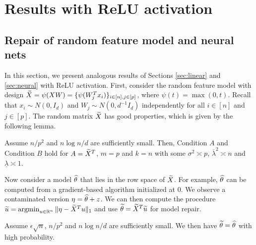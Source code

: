 


\section{Results with ReLU activation}


\subsection{Repair of random feature model and neural nets} \label{app:results}

In this section, we present analogous results of Sections \ref{sec:linear} and \ref{sec:neural} with ReLU activation. First, consider the random feature model with design $\widetilde{X}=\psi(XW)=\{\psi(W_j^Tx_i)\}_{i\in[n],j\in[p]}$, where $\psi(t)=\max(0,t)$. Recall that $x_i\sim N(0,I_d)$ and $W_j\sim N(0,d^{-1}I_d)$ independently for all $i\in[n]$ and $j\in[p]$. The random matrix $\widetilde{X}$ has good properties, which is given by the following lemma.
\begin{lemma}\label{lem:design-rf-relu}
Assume $n/p^2$ and $n\log n/d$ are sufficiently small. Then, Condition $A$ and Condition $B$ hold for $A=\widetilde{X}^T$, $m=p$ and $k=n$ with some $\sigma^2\asymp p$, $\overline{\lambda}^2\asymp n$ and $\underline{\lambda}\asymp 1$.
\end{lemma}

Now consider a model $\widehat{\theta}$ that lies in the row space of $\widetilde{X}$. For example, $\widehat{\theta}$ can be computed from a gradient-based algorithm initialized at $0$. We observe a contaminated version $\eta=\widehat{\theta}+z$.
We can then compute the procedure $\widetilde{u}=\mathop{\rm argmin}_{u\in\mathbb{R}^n}\|\eta-\widetilde{X}^Tu\|_1$ and use $\widetilde{\theta}=\widetilde{X}^T\widetilde{u}$ for model repair.

\begin{corollary}\label{cor:repair-rf-relu}
Assume $\epsilon\sqrt{n}$, $n/p^2$ and $n\log n/d$ are sufficiently small. We then have $\widetilde{\theta}=\widehat{\theta}$ with high probability.
\end{corollary}

